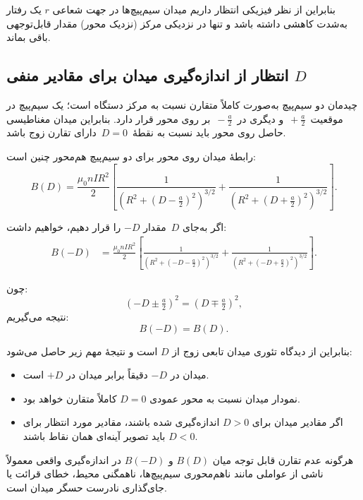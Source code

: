 \documentclass[a4paper, 11pt]{article}
\begin{document}
بنابراین از نظر فیزیکی انتظار داریم میدان سیم‌پیچ‌ها در جهت شعاعی \(r\) یک رفتار به‌شدت کاهشی داشته باشد و تنها در نزدیکی مرکز (نزدیک محور) مقدار قابل‌توجهی باقی بماند.

\subsection{انتظار از اندازه‌گیری میدان برای مقادیر منفی \texorpdfstring{$D$}{D}}

چیدمان دو سیم‌پیچ به‌صورت کاملاً متقارن نسبت به مرکز دستگاه است؛ یک سیم‌پیچ در موقعیت
\(\,+\tfrac{a}{2}\,\)
و دیگری در
\(\,-\tfrac{a}{2}\,\)
بر روی محور قرار دارد. بنابراین میدان مغناطیسی حاصل روی محور باید نسبت به نقطهٔ
\(\,D=0\,\)
دارای تقارن زوج باشد.

رابطهٔ میدان روی محور برای دو سیم‌پیچ هم‌محور چنین است:
\begin{equation}
B(D)
=
\frac{\mu_0 n I R^2}{2}
\left[
\frac{1}{\left(R^2 + (D - \tfrac{a}{2})^2\right)^{3/2}}
+
\frac{1}{\left(R^2 + (D + \tfrac{a}{2})^2\right)^{3/2}}
\right].
\end{equation}

اگر به‌جای \(\,D\) مقدار \(-D\) را قرار دهیم، خواهیم داشت:
\begin{align}
B(-D)
&=
\frac{\mu_0 n I R^2}{2}
\left[
\frac{1}{\left(R^2 + (-D - \tfrac{a}{2})^2\right)^{3/2}}
+
\frac{1}{\left(R^2 + (-D + \tfrac{a}{2})^2\right)^{3/2}}
\right].
\end{align}

چون:
\[
(-D \pm \tfrac{a}{2})^2 = (D \mp \tfrac{a}{2})^2,
\]
نتیجه می‌گیریم:
\begin{equation}
B(-D) = B(D).
\end{equation}

بنابراین از دیدگاه تئوری میدان تابعی زوج از \(D\) است و نتیجهٔ مهم زیر حاصل می‌شود:
\begin{itemize}
    \item میدان در \(-D\) دقیقاً برابر میدان در \(+D\) است.
    \item نمودار میدان نسبت به محور عمودی \(D=0\) کاملاً متقارن خواهد بود.
    \item اگر مقادیر میدان برای \(D>0\) اندازه‌گیری شده باشند، مقادیر مورد انتظار برای \(D<0\) باید تصویر آینه‌ای همان نقاط باشند.
\end{itemize}

هرگونه عدم تقارن قابل توجه میان \(B(D)\) و \(B(-D)\) در اندازه‌گیری واقعی معمولاً ناشی از عواملی مانند ناهم‌محوری سیم‌پیچ‌ها، ناهمگنی محیط، خطای قرائت یا جای‌گذاری نادرست حسگر میدان است.
\end{document}
